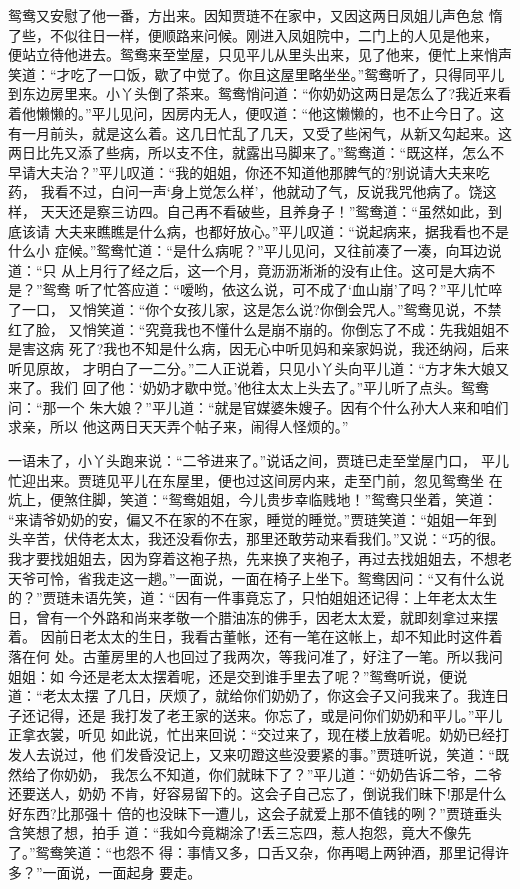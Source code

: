 鸳鸯又安慰了他一番，方出来。因知贾琏不在家中，又因这两日凤姐儿声色怠
惰了些，不似往日一样，便顺路来问候。刚进入凤姐院中，二门上的人见是他来，
便站立待他进去。鸳鸯来至堂屋，只见平儿从里头出来，见了他来，便忙上来悄声
笑道：“才吃了一口饭，歇了中觉了。你且这屋里略坐坐。”鸳鸯听了，只得同平儿
到东边房里来。小丫头倒了茶来。鸳鸯悄问道：“你奶奶这两日是怎么了?我近来看
着他懒懒的。”平儿见问，因房内无人，便叹道：“他这懒懒的，也不止今日了。这
有一月前头，就是这么着。这几日忙乱了几天，又受了些闲气，从新又勾起来。这
两日比先又添了些病，所以支不住，就露出马脚来了。”鸳鸯道：“既这样，怎么不
早请大夫治？”平儿叹道：“我的姐姐，你还不知道他那脾气的?别说请大夫来吃药，
我看不过，白问一声‘身上觉怎么样’，他就动了气，反说我咒他病了。饶这样，
天天还是察三访四。自己再不看破些，且养身子！”鸳鸯道：“虽然如此，到底该请
大夫来瞧瞧是什么病，也都好放心。”平儿叹道：“说起病来，据我看也不是什么小
症候。”鸳鸯忙道：“是什么病呢？”平儿见问，又往前凑了一凑，向耳边说道：“只
从上月行了经之后，这一个月，竟沥沥淅淅的没有止住。这可是大病不是？”鸳鸯
听了忙答应道：“嗳哟，依这么说，可不成了‘血山崩’了吗？”平儿忙啐了一口，
又悄笑道：“你个女孩儿家，这是怎么说?你倒会咒人。”鸳鸯见说，不禁红了脸，
又悄笑道：“究竟我也不懂什么是崩不崩的。你倒忘了不成：先我姐姐不是害这病
死了?我也不知是什么病，因无心中听见妈和亲家妈说，我还纳闷，后来听见原故，
才明白了一二分。”二人正说着，只见小丫头向平儿道：“方才朱大娘又来了。我们
回了他：‘奶奶才歇中觉。’他往太太上头去了。”平儿听了点头。鸳鸯问：“那一个
朱大娘？”平儿道：“就是官媒婆朱嫂子。因有个什么孙大人来和咱们求亲，所以
他这两日天天弄个帖子来，闹得人怪烦的。”

一语未了，小丫头跑来说：“二爷进来了。”说话之间，贾琏已走至堂屋门口，
平儿忙迎出来。贾琏见平儿在东屋里，便也过这间房内来，走至门前，忽见鸳鸯坐
在炕上，便煞住脚，笑道：“鸳鸯姐姐，今儿贵步幸临贱地！”鸳鸯只坐着，笑道：
“来请爷奶奶的安，偏又不在家的不在家，睡觉的睡觉。”贾琏笑道：“姐姐一年到
头辛苦，伏侍老太太，我还没看你去，那里还敢劳动来看我们。”又说：“巧的很。
我才要找姐姐去，因为穿着这袍子热，先来换了夹袍子，再过去找姐姐去，不想老
天爷可怜，省我走这一趟。”一面说，一面在椅子上坐下。鸳鸯因问：“又有什么说
的？”贾琏未语先笑，道：“因有一件事竟忘了，只怕姐姐还记得：上年老太太生
日，曾有一个外路和尚来孝敬一个腊油冻的佛手，因老太太爱，就即刻拿过来摆着。
因前日老太太的生日，我看古董帐，还有一笔在这帐上，却不知此时这件着落在何
处。古董房里的人也回过了我两次，等我问准了，好注了一笔。所以我问姐姐：如
今还是老太太摆着呢，还是交到谁手里去了呢？”鸳鸯听说，便说道：“老太太摆
了几日，厌烦了，就给你们奶奶了，你这会子又问我来了。我连日子还记得，还是
我打发了老王家的送来。你忘了，或是问你们奶奶和平儿。”平儿正拿衣裳，听见
如此说，忙出来回说：“交过来了，现在楼上放着呢。奶奶已经打发人去说过，他
们发昏没记上，又来叨蹬这些没要紧的事。”贾琏听说，笑道：“既然给了你奶奶，
我怎么不知道，你们就昧下了？”平儿道：“奶奶告诉二爷，二爷还要送人，奶奶
不肯，好容易留下的。这会子自己忘了，倒说我们昧下!那是什么好东西?比那强十
倍的也没昧下一遭儿，这会子就爱上那不值钱的咧？”贾琏垂头含笑想了想，拍手
道：“我如今竟糊涂了!丢三忘四，惹人抱怨，竟大不像先了。”鸳鸯笑道：“也怨不
得：事情又多，口舌又杂，你再喝上两钟酒，那里记得许多？”一面说，一面起身
要走。

